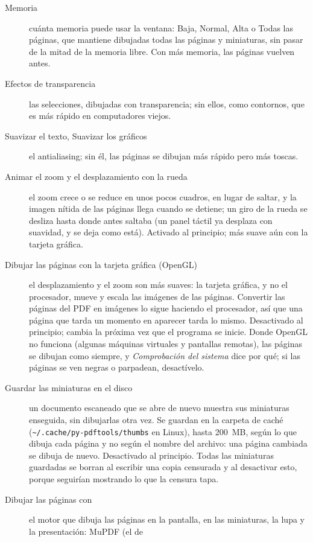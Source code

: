 \documentclass[12pt,
              article,
              oneside
              ]{memoir}
\newcommand*{\menu}[1]{\textit{#1}}
\begin{document}
%
\begin{description}
\item[Memoria] cuánta memoria puede usar la ventana: Baja, Normal, Alta o
  Todas las páginas, que mantiene dibujadas todas las páginas y miniaturas,
  sin pasar de la mitad de la memoria libre. Con más memoria, las páginas
  vuelven antes.
\item[Efectos de transparencia] las selecciones, dibujadas con
  transparencia; sin ellos, como contornos, que es más rápido en
  computadores viejos.
\item[Suavizar el texto, Suavizar los gráficos] el antialiasing; sin él,
  las páginas se dibujan más rápido pero más toscas.
\item[Animar el zoom y el desplazamiento con la rueda] el zoom crece o se
  reduce en unos pocos cuadros, en lugar de saltar, y la imagen nítida de
  las páginas llega cuando se detiene; un giro de la rueda se desliza
  hasta donde antes saltaba (un panel táctil ya desplaza con suavidad, y se
  deja como está). Activado al principio; más suave aún con la tarjeta
  gráfica.
\item[Dibujar las páginas con la tarjeta gráfica (OpenGL)] el
  desplazamiento y el zoom son más suaves: la tarjeta gráfica, y no el
  procesador, mueve y escala las imágenes de las páginas. Convertir las
  páginas del PDF en imágenes lo sigue haciendo el procesador, así que una
  página que tarda un momento en aparecer tarda lo mismo. Desactivado al
  principio; cambia la próxima vez que el programa se inicie. Donde OpenGL
  no funciona (algunas máquinas virtuales y pantallas remotas), las páginas
  se dibujan como siempre, y \menu{Comprobación del sistema} dice por qué;
  si las páginas se ven negras o parpadean, desactívelo.
\item[Guardar las miniaturas en el disco] un documento escaneado que se
  abre de nuevo muestra sus miniaturas enseguida, sin dibujarlas otra vez.
  Se guardan en la carpeta de caché
  (\texttt{\textasciitilde/.cache/py-pdftools/thumbs} en Linux), hasta
  200~MB, según lo que dibuja cada página y no según el nombre del archivo:
  una página cambiada se dibuja de nuevo. Desactivado al principio. Todas
  las miniaturas guardadas se borran al escribir una copia censurada y al
  desactivar esto, porque seguirían mostrando lo que la censura tapa.
\item[Dibujar las páginas con] el motor que dibuja las páginas en la
  pantalla, en las miniaturas, la lupa y la presentación: MuPDF (el de

\end{description}
\end{document}
